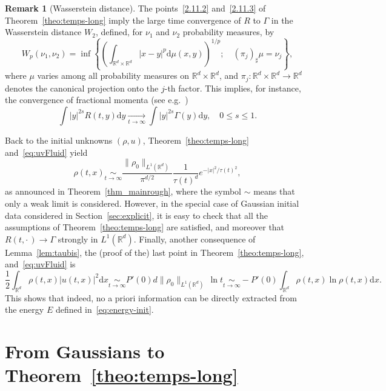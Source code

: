 \documentclass[11pt]{article}
\theoremstyle{definition}
\newtheorem{rema}[theo]{Remark}
\numberwithin{equation}{section}
\numberwithin{figure}{section}
\numberwithin{table}{section}
\newcommand*\R{\mathbb{R}}
\newcommand*\dd {\mathrm{d}}
\newcommand*\<{\left\langle}
\renewcommand*\>{\right\rangle}
\renewcommand*\le{\leqslant}
\newcommand*\Eq[2]{\mathop{\sim}\limits_{#1\rightarrow#2}}
\newcommand*\Tend[2]{\mathop{\longrightarrow}\limits_{#1\rightarrow#2}}
\begin{document}
\begin{rema}[Wasserstein distance]
The points~\eqref{2.11.2} and~\eqref{2.11.3} of Theorem~\ref{theo:temps-long} imply the large time convergence of $R$ to $\Gamma$ in the Wasserstein distance $W_2$, defined, for $\nu_1$ and $\nu_2$ probability measures, by
\begin{equation*}
W_p(\nu_1,\nu_2)=\inf \left\{ \left(\int_{{\mathbb R}^d\times {\mathbb R}^d}|x-y|^p\dd \mu(x,y)\right)^{1/p};\quad (\pi_j)_\sharp
\mu=\nu_j\right\},
\end{equation*}
where $\mu$ varies among all probability measures on ${\mathbb R}^d\times {\mathbb R}^d$, and $\pi_j:{\mathbb R}^d\times {\mathbb R}^d\to {\mathbb R}^d$ denotes the canonical projection onto the $j$-th factor. This implies, for instance, the convergence of fractional momenta (see e.g.~\cite[Theorem~7.12]{Vi03})
\begin{equation}\label{eq:moment-int}
\int |y|^{2s}R(t,y) \dd y\Tend t \infty \int |y|^{2s}\Gamma(y)\dd y,\quad 0\le s\le 1.
\end{equation}
\end{rema}

Back to the initial unknowns $(\rho,u)$, Theorem~\ref{theo:temps-long} and~\eqref{eq:uvFluid} yield
\begin{equation*}
\rho(t,x)\Eq t \infty
\frac{\|\rho_0\|_{L^1(\R^d)}}{\pi^{d/2}}\frac{1}{\tau(t)^d}e^{-|x|^2/\tau(t)^2},
\end{equation*}
as announced in Theorem~\ref{thm_mainrough}, where the symbol $\sim$ means that only a weak limit is considered. However, in the special case of Gaussian initial data considered in Section~\ref{sec:explicit}, it is easy to check that all the assumptions of Theorem~\ref{theo:temps-long} are satisfied, and moreover that $R(t,\cdot\,)\to \Gamma$ strongly in $L^1(\R^d)$. Finally, another consequence of Lemma~\ref{lem:taubis}, the (proof of the) last point in Theorem~\ref{theo:temps-long}, and~\eqref{eq:uvFluid} is
\begin{equation*}
\frac{1}{2}\int_{\R^d}\rho(t,x) |u(t,x)|^2 \dd x\Eq t \infty P'(0)d\|\rho_0\|_{L^1(\R^d)} \, \ln t \Eq t
\infty -P'(0)\int_{\R^d} \rho(t,x)\ln \rho(t,x)\dd x.
\end{equation*}
This shows that indeed, no a priori information can be directly extracted from the energy $E$ defined in~\eqref{eq:energy-init}.


\section{From Gaussians to Theorem~\ref{theo:temps-long}}\label{sec:longtime}
\end{document}
